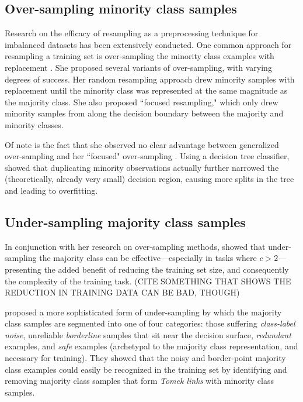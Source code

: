\documentclass[twoside,11pt]{article}
\begin{document}
\subsection{Over-sampling minority class samples}

Research on the efficacy of resampling as a preprocessing technique for imbalanced datasets has been extensively conducted. One common approach for resampling a training set is over-sampling the minority class examples with replacement \citep{japkowicz2000class}. She proposed several variants of over-sampling, with varying degrees of success. Her random resampling approach drew minority samples with replacement until the minority class was represented at the same magnitude as the majority class. She also proposed ``focused resampling," which only drew minority samples from along the decision boundary between the majority and minority classes. 

Of note is the fact that she observed no clear advantage between generalized over-sampling and her ``focused" over-sampling \citep{japkowicz2000class}. Using a decision tree classifier, \citet{chawla2002smote} showed that duplicating minority observations actually further narrowed the (theoretically, already very small) decision region, causing more splits in the tree and leading to overfitting.


\subsection{Under-sampling majority class samples}

In conjunction with her research on over-sampling methods, \citet*{japkowicz2000learning} showed that under-sampling the majority class can be effective---especially in tasks where $c > 2$---presenting the added benefit of reducing the training set size, and consequently the complexity of the training task. (CITE SOMETHING THAT SHOWS THE REDUCTION IN TRAINING DATA CAN BE BAD, THOUGH)

\citet*{kubat1997addressing} proposed a more sophisticated form of under-sampling by which the majority class samples are segmented into one of four categories: those suffering \emph{class-label noise}, unreliable \emph{borderline} samples that sit near the decision surface, \emph{redundant} examples, and \emph{safe} examples (archetypal to the majority class representation, and necessary for training). They showed that the noisy and border-point majority class examples could easily be recognized in the training set by identifying and removing majority class samples that form \emph{Tomek links} \citep{tomek1976two} with minority class samples.
\end{document}
